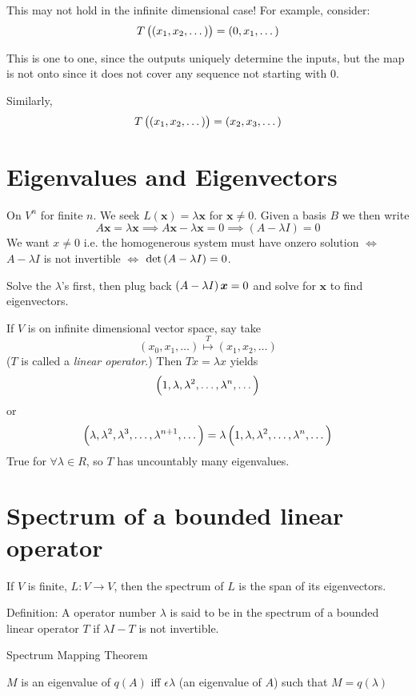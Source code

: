 \documentclass{article}
\begin{document}
This may not hold in the infinite dimensional case!
For example, consider:
\[T\del{\del{x_1, x_2, \dots}} = \del{0, x_1, \dots}\]

This is one to one, since the outputs uniquely determine the inputs, but the map is not onto since it does not cover any sequence not starting with \(0\).

Similarly,
\[T\del{\del{x_1, x_2, \dots}} = \del{x_2, x_3, \dots}\]

\section{Eigenvalues and Eigenvectors}
On \(V^n\) for finite \(n\).
We seek \(L(\bm x) = \lambda \bm x\) for \(\bm x \neq 0\).
Given a basis \(B\) we then write
\[A\bm x = \lambda \bm x \implies A\bm x - \lambda \bm x = 0 \implies (A - \lambda I) = 0\]
We want \(x \neq 0\) i.e. the homogenerous system must have onzero solution \(\Longleftrightarrow\) \(A-\lambda I\) is not invertible \(\Longleftrightarrow\) \( \det\del{A - \lambda I} = 0\).

Solve the \(\lambda\)'s first, then plug back \(\del{A - \lambda I}\bm x = 0 \) and solve for \(\bm x\) to find eigenvectors.

If \(V\) is on infinite dimensional vector space, say take
\[(x_0, x_1 ,\dots) \stackrel{T}{\mapsto} (x_1, x_2, \dots)\]
(\(T\) is called a \textit{linear operator}.)
Then \(Tx = \lambda x\) yields
\[\del{1, \lambda, \lambda^2, \dots, \lambda^n, \dots}\]
or
\[\del{\lambda, \lambda^2,\lambda^3, \dots, \lambda^{n+1}, \dots} = \lambda\del{1, \lambda, \lambda^2, \dots, \lambda^n, \dots}\]
True for \(\forall \lambda \in R\), so \(T\) has uncountably many eigenvalues.

\section{Spectrum of a bounded linear operator}
If \(V\) is finite, \(L: V \to V\), then the spectrum of \(L\)  is the span of its eigenvectors.

Definition: A operator number \(\lambda\) is said to be in the spectrum of a bounded linear operator \(T\) if \(\lambda I - T\) is not invertible.

Spectrum Mapping Theorem
\begin{center}
\end{center}
\(M\) is an eigenvalue of \(q(A)\) iff \(\epsilon \lambda\) (an eigenvalue of \(A\)) such that \(M = q(\lambda)\)
\end{document}
